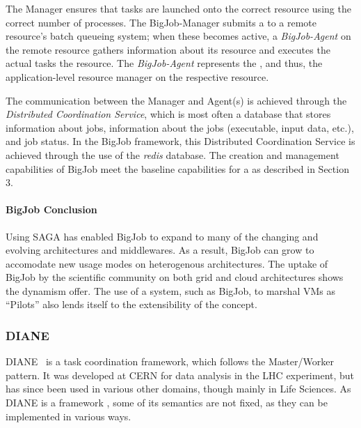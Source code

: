 \documentclass{sig-alternate}
\begin{document}
The Manager ensures that tasks are launched onto the correct resource
using the correct number of processes. The BigJob-Manager submits a
\pilot to a remote resource's batch queueing system; when these
\pilots becomes active, a \textit{BigJob-Agent} on the remote resource
gathers information about its resource
and executes the actual tasks the resource. The \textit{BigJob-Agent}
represents the \pilotjob, and thus, the application-level resource
manager on the respective resource.

The communication between the Manager and Agent(s) is achieved through
the {\it Distributed Coordination Service}, which is most often a
database that stores information about jobs, information about the
jobs (executable, input data, etc.), and job status. In the BigJob framework,
this Distributed Coordination Service is achieved through the use
of the \textit{redis} database.
The \pilot creation and management capabilities of BigJob meet
the baseline capabilities for a \pilotjob as described in Section 3.


\paragraph{BigJob Conclusion}
Using SAGA has enabled BigJob to expand to many of the changing and evolving
architectures and middlewares. As a result, BigJob can grow to accomodate
new usage modes on heterogenous architectures. The uptake
of BigJob by the scientific community
on both grid and cloud architectures shows the dynamism \pilotjobs offer.
The use of a \pilotjob system, such as BigJob, to marshal VMs as ``Pilots''
also lends itself to the extensibility of the \pilotjob concept.

\subsubsection{DIANE}


DIANE~\cite{Moscicki:908910} is a task coordination framework, which follows
the Master/Worker pattern.
It was developed at CERN for data analysis in the LHC experiment, but has since
been used in various other domains, though mainly in Life Sciences.
As DIANE is a framework , some of its
semantics are not fixed, as they can be implemented in various ways.
\end{document}
